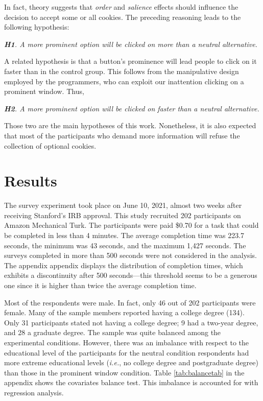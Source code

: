 \documentclass[
  11pt,
  letterpaper,
]{article}
\begin{document}
In fact, theory suggests that \emph{order} and \emph{salience} effects should influence the decision to accept some or all cookies. The preceding reasoning leads to the following hypothesis:

\emph{\textbf{H1}. A more prominent option will be clicked on more than a neutral alternative.}

A related hypothesis is that a button's prominence will lead people to click on it faster than in the control group. This follows from the manipulative design employed by the programmers, who can exploit our inattention clicking on a prominent window. Thus,

\emph{\textbf{H2}. A more prominent option will be clicked on faster than a neutral alternative.}

Those two are the main hypotheses of this work. Nonetheless, it is also expected that most of the participants who demand more information will refuse the collection of optional cookies.

\hypertarget{results}{%
\section{Results}\label{results}}

The survey experiment took place on June 10, 2021, almost two weeks after receiving Stanford's IRB approval. This study recruited 202 participants on Amazon Mechanical Turk. The participants were paid \$0.70 for a task that could be completed in less than 4 minutes. The average completion time was 223.7 seconds, the minimum was 43 seconds, and the maximum 1,427 seconds. The surveys completed in more than 500 seconds were not considered in the analysis. The appendix appendix displays the distribution of completion times, which exhibits a discontinuity after 500 seconds---this threshold seems to be a generous one since it is higher than twice the average completion time.

Most of the respondents were male. In fact, only 46 out of 202 participants were female. Many of the sample members reported having a college degree (134). Only 31 participants stated not having a college degree; 9 had a two-year degree, and 28 a graduate degree. The sample was quite balanced among the experimental conditions. However, there was an imbalance with respect to the educational level of the participants for the neutral condition respondents had more extreme educational levels (\emph{i.e.}, no college degree and postgraduate degree) than those in the prominent window condition. Table \ref{tab:balancetab} in the appendix shows the covariates balance test. This imbalance is accounted for with regression analysis.
\end{document}
